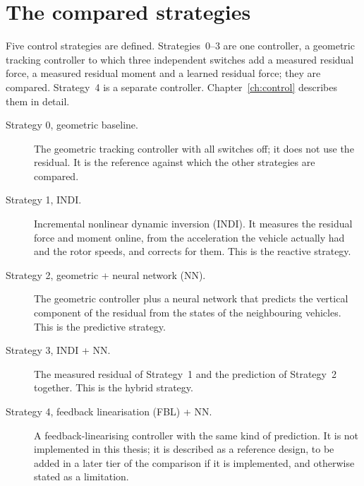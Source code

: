 \section{The compared strategies}
\label{sec:intro-strategies}

Five control strategies are defined. Strategies~0--3 are one controller, a geometric tracking
controller to which three independent switches add a measured residual force, a measured residual
moment and a learned residual force; they are compared. Strategy~4 is a separate controller.
Chapter~\ref{ch:control} describes them in detail.

\begin{description}
  \item[Strategy 0, geometric baseline.] The geometric tracking controller with all switches off;
    it does not use the residual. It is the reference against which the other strategies are
    compared.
  \item[Strategy 1, INDI.] Incremental nonlinear dynamic inversion (INDI). It measures the residual
    force and moment online, from the acceleration the vehicle actually had and the rotor speeds,
    and corrects for them. This is the reactive strategy.
  \item[Strategy 2, geometric + neural network (NN).] The geometric controller plus a neural network
    that predicts the vertical component of the residual from the states of the neighbouring
    vehicles. This is the predictive strategy.
  \item[Strategy 3, INDI + NN.] The measured residual of Strategy~1 and the prediction of
    Strategy~2 together. This is the hybrid strategy.
  \item[Strategy 4, feedback linearisation (FBL) + NN.] A feedback-linearising controller with the
    same kind of prediction. It is not implemented in this thesis; it is described as a reference
    design, to be added in a later tier of the comparison if it is implemented, and otherwise
    stated as a limitation.
\end{description}

